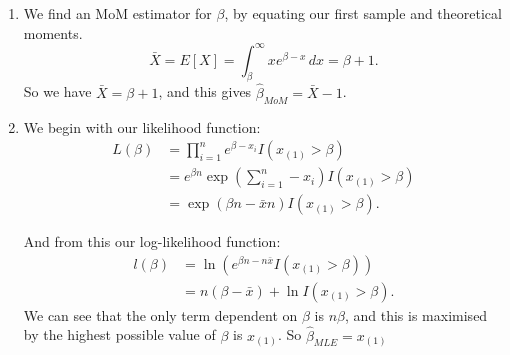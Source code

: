 \item  \begin{enumerate}[label= (\alph*)] 
        \item We find an MoM estimator for $\beta$, by equating our first sample and theoretical 
            moments.
            \[
                \bar{X}=E[X]=\int_{\beta}^{\infty} xe^{\beta-x} \, d x =\beta+1
            .\] 
            So we have $\bar{X}=\beta+1$, and this gives $\hat{\beta}_{MoM}=\bar{X}-1$.

        \item We begin with our likelihood function:
            \begin{align*}
                L(\beta)&=\prod_{i=1}^{n}e^{\beta-x_i}I(x_{(1)}>\beta)\\
                &= e^{\beta n}\exp{\left(\sum_{i=1}^{n} -x_i\right)} I(x_{(1)}>\beta)\\
                &= \exp(\beta n- \bar{x}n)I(x_{(1)}>\beta)
            .\end{align*}

            And from this our log-likelihood function:
            \begin{align*}
                l(\beta)&= \ln(e^{\beta n- n \bar{x}}I(x_{(1)}>\beta)) \\
                &= n(\beta-\bar{x})+\ln I(x_{(1)}>\beta) 
            .\end{align*}
            We can see that the only term dependent on $\beta$ is $n\beta$, and this is maximised by the highest possible 
            value of $\beta$ is $x_{(1)}$. So $\hat{\beta}_{MLE}=x_(1)$ 
    \end{enumerate}
